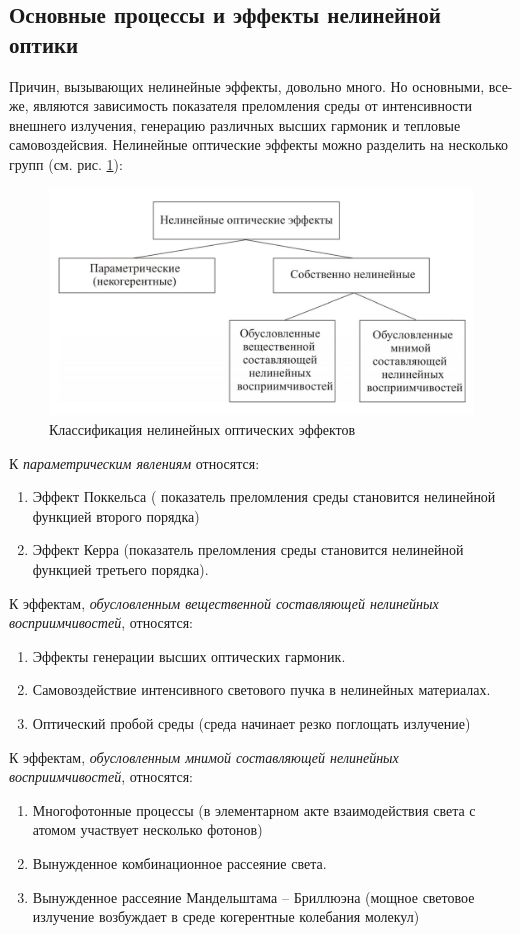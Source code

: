 \subsection{Основные процессы и эффекты нелинейной оптики}
Причин, вызывающих нелинейные эффекты, довольно много. Но основными, все-же, являются зависимость показателя преломления среды от интенсивности внешнего излучения, генерацию различных высших гармоник и тепловые самовоздейсвия. Нелинейные оптические эффекты можно разделить на несколько групп (см. рис. \ref{classific}):
\begin{figure}[h]
	\centering
	\includegraphics[width=0.7\linewidth]{images/classific.png}
	\caption{Классификация нелинейных оптических эффектов}
	\label{classific}
\end{figure}
К \textit{параметрическим явлениям} относятся:
\begin{enumerate}
\item   Эффект Поккельса ( показатель преломления среды становится нелинейной функцией второго порядка)
\item  Эффект Керра (показатель преломления среды становится нелинейной функцией третьего порядка).
\end{enumerate}
К эффектам, \textit{обусловленным вещественной составляющей нелинейных восприимчивостей}, относятся:
\begin{enumerate}
\item  Эффекты генерации высших оптических гармоник.
\item  Самовоздействие интенсивного светового пучка в нелинейных материалах.
\item Оптический пробой среды (среда начинает резко поглощать излучение)
\end{enumerate}
К эффектам, \textit{обусловленным мнимой составляющей нелинейных восприимчивостей}, относятся:
\begin{enumerate}
\item  Многофотонные процессы (в элементарном акте взаимодействия света с атомом участвует несколько фотонов)
\item  Вынужденное комбинационное рассеяние света.
\item Вынужденное рассеяние Мандельштама – Бриллюэна  (мощное световое излучение возбуждает в среде когерентные колебания молекул)
\end{enumerate}


